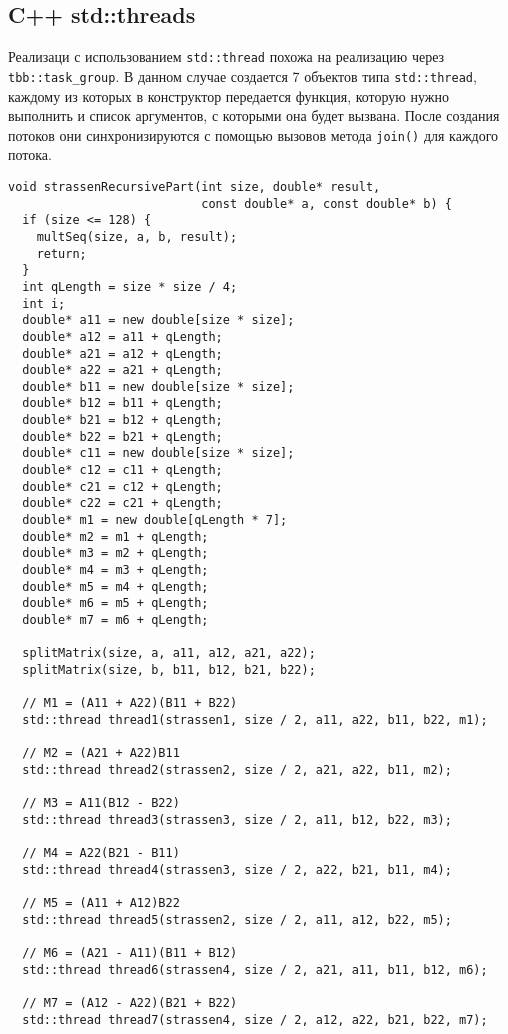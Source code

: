 \documentclass{report}
\begin{document}
\subsection{C++ std::threads}

Реализаци с использованием \lstinline{std::thread} похожа на реализацию через \lstinline{tbb::task_group}. В данном случае создается 7 объектов типа \lstinline{std::thread}, каждому из которых в конструктор передается функция, которую нужно выполнить и список аргументов, с которыми она будет вызвана. После создания потоков они синхронизируются с помощью вызовов метода \lstinline{join()} для каждого потока.

\begin{lstlisting}
void strassenRecursivePart(int size, double* result,
                           const double* a, const double* b) {
  if (size <= 128) {
    multSeq(size, a, b, result);
    return;
  }
  int qLength = size * size / 4;
  int i;
  double* a11 = new double[size * size];
  double* a12 = a11 + qLength;
  double* a21 = a12 + qLength;
  double* a22 = a21 + qLength;
  double* b11 = new double[size * size];
  double* b12 = b11 + qLength;
  double* b21 = b12 + qLength;
  double* b22 = b21 + qLength;
  double* c11 = new double[size * size];
  double* c12 = c11 + qLength;
  double* c21 = c12 + qLength;
  double* c22 = c21 + qLength;
  double* m1 = new double[qLength * 7];
  double* m2 = m1 + qLength;
  double* m3 = m2 + qLength;
  double* m4 = m3 + qLength;
  double* m5 = m4 + qLength;
  double* m6 = m5 + qLength;
  double* m7 = m6 + qLength;

  splitMatrix(size, a, a11, a12, a21, a22);
  splitMatrix(size, b, b11, b12, b21, b22);

  // M1 = (A11 + A22)(B11 + B22)
  std::thread thread1(strassen1, size / 2, a11, a22, b11, b22, m1);

  // M2 = (A21 + A22)B11
  std::thread thread2(strassen2, size / 2, a21, a22, b11, m2);

  // M3 = A11(B12 - B22)
  std::thread thread3(strassen3, size / 2, a11, b12, b22, m3);

  // M4 = A22(B21 - B11)
  std::thread thread4(strassen3, size / 2, a22, b21, b11, m4);

  // M5 = (A11 + A12)B22
  std::thread thread5(strassen2, size / 2, a11, a12, b22, m5);

  // M6 = (A21 - A11)(B11 + B12)
  std::thread thread6(strassen4, size / 2, a21, a11, b11, b12, m6);

  // M7 = (A12 - A22)(B21 + B22)
  std::thread thread7(strassen4, size / 2, a12, a22, b21, b22, m7);


\end{lstlisting}
\end{document}

